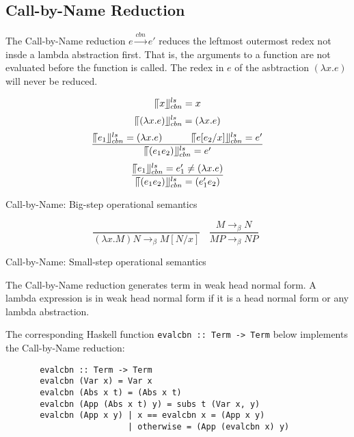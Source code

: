 \documentclass[a4paper,11pt,twoside]{report}
\begin{document}
\subsection{Call-by-Name Reduction}{\label{subsec:cbn}}

The Call-by-Name reduction $e\xrightarrow{cbn} e'$ reduces the leftmost outermost redex not insde a lambda abstraction first. That is, the arguments to a function are not evaluated before the function is called. The redex in $e$ of the asbtraction $(\lambda x.e)$ will never be reduced. 


\begin{equation*}
\llceil x \rrfloor ^{ls} _{cbn} = x
\end{equation*}
\begin{equation*}
\llceil (\lambda x.e) \rrfloor ^{ls} _{cbn} = (\lambda x.e)
\end{equation*}
\begin{equation*}
\frac{\llceil e_1 \rrfloor ^{ls} _{cbn} = (\lambda x.e)\ \ \ \ \ \ \ \ \ \llceil e[e_2/x] \rrfloor ^{ls} _{cbn} = e'}{\llceil (e_1e_2) \rrfloor ^{ls} _{cbn} = e'}
\end{equation*}
\begin{equation*}
\frac{\llceil e_1 \rrfloor ^{ls} _{cbn} = e'_1\neq (\lambda x.e)}{\llceil (e_1e_2) \rrfloor ^{ls} _{cbn} = (e'_1e_2)}
\end{equation*}
\begin{center}
Call-by-Name: Big-step operational semantics
\end{center}

\begin{equation*}
\frac{}{(\lambda x.M)N \rightarrow _\beta M[N/x]}\ \ \ \  
\frac{M \rightarrow _\beta N}{MP \rightarrow _\beta NP}\ \ 
\end{equation*}
\begin{center}
Call-by-Name: Small-step operational semantics
\end{center}

The Call-by-Name reduction generates term in weak head normal form. A lambda expression is in weak head normal form if it is a head normal form or any lambda abstraction. 


The corresponding Haskell function \verb|evalcbn :: Term -> Term| below implements the Call-by-Name reduction:

\begin{verbatim}
       evalcbn :: Term -> Term
       evalcbn (Var x) = Var x
       evalcbn (Abs x t) = (Abs x t)
       evalcbn (App (Abs x t) y) = subs t (Var x, y)
       evalcbn (App x y) | x == evalcbn x = (App x y)
	                     | otherwise = (App (evalcbn x) y) 
\end{verbatim}
\end{document}

